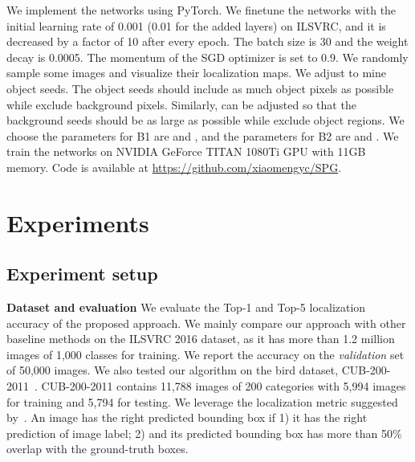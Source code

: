 \documentclass[runningheads]{llncs}
\begin{document}
We implement the networks using PyTorch.
We finetune the networks with the initial learning rate of 0.001 (0.01 for the added layers) on ILSVRC,
and it is decreased by a factor of 10 after every epoch.
The batch size is 30 and the weight decay is 0.0005. The momentum of the SGD optimizer is set to 0.9.
We randomly sample some images and visualize their localization maps.
We adjust  to mine object seeds.
The object seeds should include as much object pixels as possible while exclude background pixels.
Similarly,  can be adjusted so that the background seeds should be as large as possible while exclude object regions.
We choose the parameters for B1 are  and , and the parameters for B2 are  and .
We train the networks on NVIDIA GeForce TITAN 1080Ti GPU with 11GB memory.
Code is available at \url{https://github.com/xiaomengyc/SPG}.
 \section{Experiments}\label{exper}
\subsection{Experiment setup}
\textbf{Dataset and evaluation}
We evaluate the Top-1 and Top-5 localization accuracy of the proposed approach.
We mainly compare our approach with other baseline methods on the ILSVRC 2016 dataset, as it has more than 1.2 million images of 1,000 classes for training.
We report the accuracy on the \textit{validation} set of 50,000 images.
We also tested our algorithm on the bird dataset, CUB-200-2011~\cite{WahCUB_200_2011}.
CUB-200-2011 contains 11,788 images of 200 categories with 5,994 images for training and 5,794 for testing.
We leverage the localization metric suggested by~\cite{ILSVRC15}.
An image has the right predicted bounding box if 1) it has the right prediction of image label; 2) and its predicted bounding box has more than 50\% overlap with the ground-truth boxes.
\end{document}
